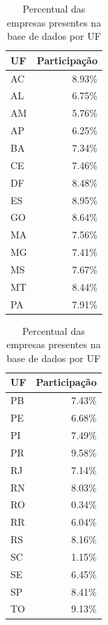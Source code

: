 \begin{table}[htb]
\centering
\caption{Percentual das empresas presentes na base de dados por UF}
\label{tab:participacao-por-uf}
\begin{subtable}[h]{0.45\textwidth}
    \centering
    \begin{tabular}{l|r}
        \toprule
        UF & Participação \\
        \midrule
        AC &    8.93\% \\
        AL &    6.75\% \\
        AM &    5.76\% \\
        AP &    6.25\% \\
        BA &    7.34\% \\
        CE &    7.46\% \\
        DF &    8.48\% \\
        ES &    8.95\% \\
        GO &    8.64\% \\
        MA &    7.56\% \\
        MG &    7.41\% \\
        MS &    7.67\% \\
        MT &    8.44\% \\
        PA &    7.91\% \\
        \bottomrule
    \end{tabular}
\end{subtable}
\begin{subtable}[h]{0.45\textwidth}
    \centering
    \begin{tabular}{l|r}
        \toprule
        UF & Participação \\
        \midrule
        PB &    7.43\% \\
        PE &    6.68\% \\
        PI &    7.49\% \\
        PR &    9.58\% \\
        RJ &    7.14\% \\
        RN &    8.03\% \\
        RO &    0.34\% \\
        RR &    6.04\% \\
        RS &    8.16\% \\
        SC &    1.15\% \\
        SE &    6.45\% \\
        SP &    8.41\% \\
        TO &    9.13\% \\
        \bottomrule
    \end{tabular}
\end{subtable}
\fdadospesquisa
\end{table}

